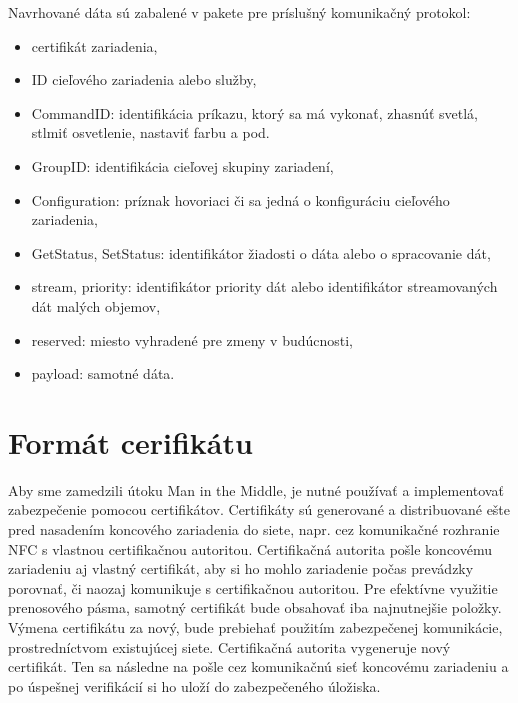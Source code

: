 \documentclass[12pt,a4wide,oneside,openright]{report}
\begin{document}
Navrhované dáta sú zabalené v pakete pre príslušný komunikačný protokol:
\singlespacing
\begin{itemize}
	\item certifikát zariadenia,
	\item ID cieľového zariadenia alebo služby,
	\item CommandID: identifikácia príkazu, ktorý sa má vykonať, zhasnúť svetlá, stlmiť osvetlenie, nastaviť farbu a pod.
	\item GroupID: identifikácia cieľovej skupiny zariadení,
	\item Configuration: príznak hovoriaci či sa jedná o konfiguráciu cieľového zariadenia,
	\item GetStatus, SetStatus: identifikátor žiadosti o dáta alebo o spracovanie dát,
	\item stream, priority: identifikátor priority dát alebo identifikátor streamovaných dát malých objemov,
	\item reserved: miesto vyhradené pre zmeny v budúcnosti,
	\item payload: samotné dáta.
\end{itemize}
\onehalfspacing


\section{Formát cerifikátu}
Aby sme zamedzili útoku Man in the Middle, je nutné používať a implementovať zabezpečenie pomocou  certifikátov. Certifikáty sú generované a distribuované ešte pred nasadením koncového zariadenia do siete, napr. cez komunikačné rozhranie NFC s vlastnou certifikačnou autoritou. Certifikačná autorita pošle koncovému zariadeniu aj vlastný certifikát, aby si ho mohlo zariadenie počas prevádzky porovnať, či naozaj komunikuje s certifikačnou autoritou.
 Pre efektívne využitie prenosového pásma, samotný certifikát bude obsahovať iba najnutnejšie položky. Výmena certifikátu za nový, bude prebiehať použitím zabezpečenej komunikácie, prostredníctvom existujúcej siete. Certifikačná autorita vygeneruje nový certifikát. Ten sa následne na pošle cez komunikačnú sieť koncovému zariadeniu a po úspešnej verifikácií si ho uloží do zabezpečeného úložiska.
\end{document}
